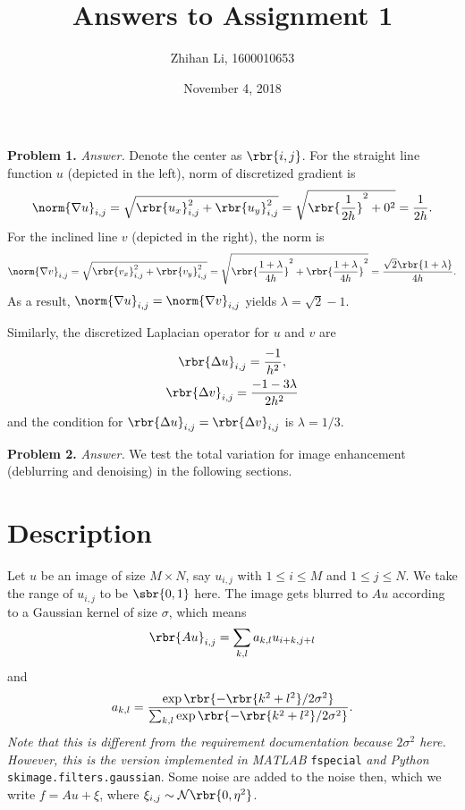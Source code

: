 \documentclass[english, nochinese]{pnote}
\title{Answers to Assignment 1}
\author{Zhihan Li, 1600010653}
\date{November 4, 2018}
\begin{document}
\maketitle

\textbf{Problem 1.} \textit{Answer.} Denote the center as $ \rbr{ i, j } $. For the straight line function $u$ (depicted in the left), norm of discretized gradient is
\begin{equation}
\norm{ \nabla u }_{ i, j } = \sqrt{ \rbr{u_x}_{ i, j }^2 + \rbr{u_y}_{ i, j } ^2 } = \sqrt{ \rbr{\frac{1}{ 2 h }}^2 + 0^2 } = \frac{1}{ 2 h }.
\end{equation}
For the inclined line $v$ (depicted in the right), the norm is
\begin{equation}
\norm{ \nabla v }_{ i, j } = \sqrt{ \rbr{v_x}_{ i, j }^2 + \rbr{v_y}_{ i, j } ^2 } = \sqrt{ \rbr{\frac{ 1 + \lambda }{ 4 h }}^2 + \rbr{\frac{ 1 + \lambda }{ 4 h }}^2 } = \frac{ \sqrt{2} \rbr{ 1 + \lambda } }{ 4 h }.
\end{equation}
As a result, $ \norm{ \nabla u }_{ i, j } = \norm{ \nabla v }_{ i, j } $ yields $ \lambda = \sqrt{2} - 1 $.

Similarly, the discretized Laplacian operator for $u$ and $v$ are
\begin{gather}
\rbr{ \Delta u }_{ i, j } = \frac{-1}{h^2}, \\
\rbr{ \Delta v }_{ i, j } = \frac{ -1 - 3 \lambda }{ 2 h^2 }
\end{gather}
and the condition for $ \rbr{ \Delta u }_{ i, j } = \rbr{ \Delta v }_{ i, j } $ is $ \lambda = 1 / 3 $.

\textbf{Problem 2.} \textit{Answer.} We test the total variation for image enhancement (deblurring and denoising) in the following sections.

\section{Description}

Let $u$ be an image of size $ M \times N $, say $ u_{ i, j } $ with $ 1 \le i \le M $ and $ 1 \le j \le N $. We take the range of $ u_{ i, j } $ to be $ \sbr{ 0, 1 } $ here. The image gets blurred to $ A u $ according to a Gaussian kernel of size $\sigma$, which means
\begin{equation}
\rbr{ A u }_{ i, j } = \sum_{ k, l } a_{ k, l } u_{ i + k, j + l }
\end{equation}
and
\begin{equation}
a_{ k, l } = \frac{ \exp \rbr{ -\rbr{ k^2 + l^2 } / 2 \sigma^2 } }{ \sum_{ k, l } \exp \rbr{ -\rbr{ k^2 + l^2 } / 2 \sigma^2 } }.
\end{equation}
\emph{Note that this is different from the requirement documentation because $ 2 \sigma^2 $ here. However, this is the version implemented in MATLAB} \verb"fspecial" \emph{and Python} \verb"skimage.filters.gaussian". Some noise are added to the noise then, which we write $ f = A u + \xi $, where $ \xi_{ i, j } \sim \mathcal{N} \rbr{ 0, \eta^2 } $.
\end{document}
